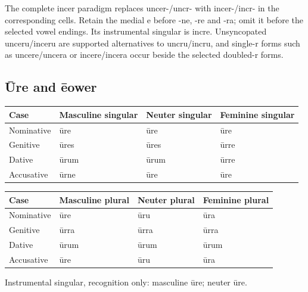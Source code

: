 The complete incer paradigm replaces uncer-/\allowbreak{}uncr- with incer-/\allowbreak{}incr- in the corresponding cells. Retain the medial e before -ne, -re and -ra; omit it before the selected vowel endings. Its instrumental singular is incre. Unsyncopated unceru/\allowbreak{}inceru are supported alternatives to uncru/\allowbreak{}incru, and single-r forms such as uncere/\allowbreak{}uncera or incere/\allowbreak{}incera occur beside the selected doubled-r forms.

\subsection*{Ūre and ēower}

\par\begingroup
\fontsize{10.5}{13.2}\selectfont
\setlength{\LTleft}{0pt}\setlength{\LTright}{\fill}
\noindent
\begin{tabular}{@{}>{\raggedright\arraybackslash}p{22.0mm}>{\raggedright\arraybackslash}p{31.188mm}>{\raggedright\arraybackslash}p{31.188mm}>{\raggedright\arraybackslash}p{31.188mm}@{}}
\toprule
\textbf{Case} & \textbf{Masculine singular} & \textbf{Neuter singular} & \textbf{Feminine singular} \\
\midrule
Nominative & ūre & ūre & ūre \\
Genitive & ūres & ūres & ūrre \\
Dative & ūrum & ūrum & ūrre \\
Accusative & ūrne & ūre & ūre \\
\bottomrule
\end{tabular}
\par\endgroup
\par\addvspace{5pt}
\par\begingroup
\fontsize{10.5}{13.2}\selectfont
\setlength{\LTleft}{0pt}\setlength{\LTright}{\fill}
\noindent
\begin{tabular}{@{}>{\raggedright\arraybackslash}p{22.0mm}>{\raggedright\arraybackslash}p{31.188mm}>{\raggedright\arraybackslash}p{31.188mm}>{\raggedright\arraybackslash}p{31.188mm}@{}}
\toprule
\textbf{Case} & \textbf{Masculine plural} & \textbf{Neuter plural} & \textbf{Feminine plural} \\
\midrule
Nominative & ūre & ūru & ūra \\
Genitive & ūrra & ūrra & ūrra \\
Dative & ūrum & ūrum & ūrum \\
Accusative & ūre & ūru & ūra \\
\bottomrule
\end{tabular}
\par\endgroup
Instrumental singular, recognition only: masculine ūre; neuter ūre.


